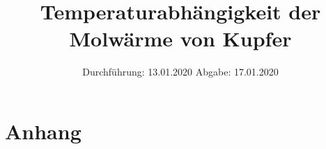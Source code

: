 
\usepackage{longtable}
\usepackage{wrapfig}
\usepackage{ dsfont }
\subject{VERSUCH 47}
\title{Temperaturabhängigkeit der Molwärme von Kupfer}
\date{%
  \hspace{-2.5em}
  Durchführung: 13.01.2020
  \hspace{4em}
  Abgabe: 17.01.2020
}


  \setlength{\parindent}{0em}
  \maketitle
  \thispagestyle{empty}
  \newpage
  \tableofcontents
  \newpage





\printbibliography{}
%
\newpage
\section{Anhang}



